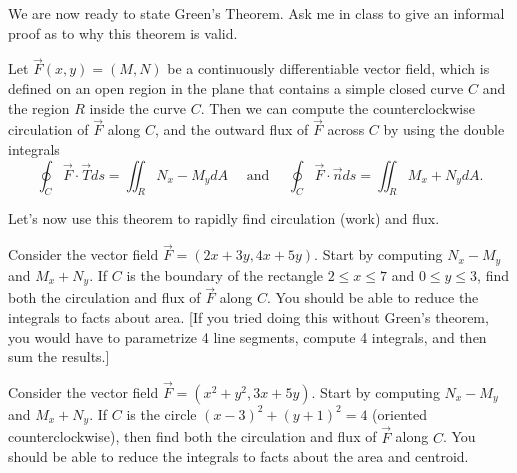 We are now ready to state Green's Theorem.  Ask me in class to give an informal proof as to why this theorem is valid.
\begin{theorem}
 Let $\vec F(x,y)=(M,N)$ be a continuously differentiable vector field, which is defined on an open region in the plane that contains a simple closed curve $C$ and the region $R$ inside the curve $C$.  Then we can compute the counterclockwise circulation of $\vec F$ along $C$, and the outward flux of $\vec F$ across $C$ by using the double integrals
$$ \oint_{C} \vec F \cdot \vec T ds=\iint_R N_x-M_y dA 
\quad \text{ and } \quad 
\oint_{C} \vec F \cdot \vec n ds=\iint_R M_x+N_y dA.$$
\end{theorem}

Let's now use this theorem to rapidly find circulation (work) and flux.


\begin{problem}
 Consider the vector field $\vec F=(2x+3y,4x+5y)$. Start by computing $N_x-M_y$ and $M_x+N_y$. 
 If $C$ is the boundary of the rectangle $2\leq x\leq 7$ and $0\leq y\leq 3$, find both the circulation and flux of $\vec F$ along $C$. You should be able to reduce the integrals to facts about area. [If you tried doing this without Green's theorem, you would have to parametrize 4 line segments, compute 4 integrals, and then sum the results.]
\end{problem}

\begin{problem}
 Consider the vector field $\vec F=(x^2+y^2,3x+5y)$. Start by computing $N_x-M_y$ and $M_x+N_y$. 
 If $C$ is the circle $(x-3)^2+(y+1)^2=4$ (oriented counterclockwise), then find both the circulation and flux of $\vec F$ along $C$. You should be able to reduce the integrals to facts about the area and centroid.
\end{problem}

